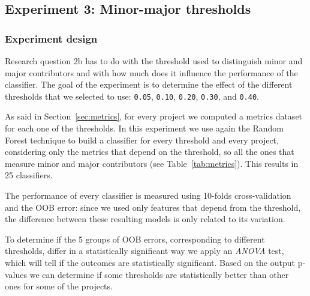 \subsection{Experiment 3: Minor-major thresholds}

\subsubsection{Experiment design}

Research question 2b has to do with the threshold used to distinguish minor and major contributors and with how much does it influence the performance of the classifier. The goal of the experiment is to determine the effect of the different thresholds that we selected to use: \texttt{0.05}, \texttt{0.10}, \texttt{0.20}, \texttt{0.30}, and \texttt{0.40}.


As said in Section~\ref{sec:metrics}, for every project we computed a metrics dataset for each one of the thresholds. In this experiment we use again the Random Forest technique to build a classifier for every threshold and every project, considering only the metrics that depend on the threshold, so all the ones that measure minor and major contributors (see Table~\ref{tab:metrics}). This results in 25 classifiers. 

The performance of every classifier is measured using 10-folds cross-validation and the OOB error: since we used only features that depend from the threshold, the difference between these resulting models is only related to its variation.

To determine if the 5 groups of OOB errors, corresponding to different thresholds, differ in a statistically significant way we apply an \textit{ANOVA} test, which will tell if the outcomes are statistically significant. Based on the output p-values we can determine if some thresholds are statistically better than other ones for some of the projects.



